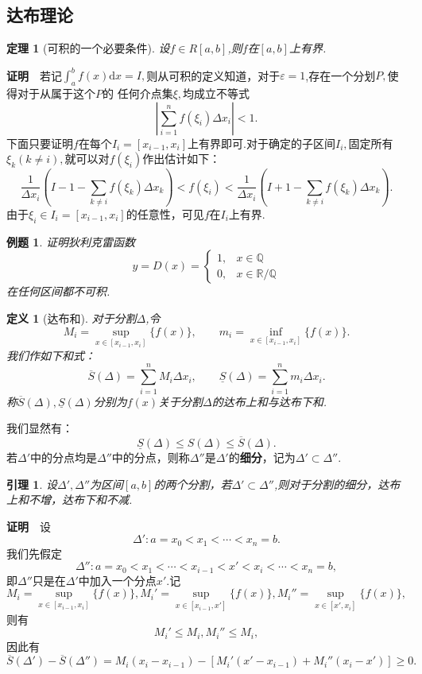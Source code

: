 \documentclass[UTF8]{article}
\newcommand{\dx}{\mathrm{d}x}
\newcommand{\zm}{\textbf{证明}$\quad$}
\newtheorem{thm}{\hspace{2em}定理}[section]
\newtheorem{lem}{\hspace{2em}引理}[section]
\newtheorem{dfn}{\hspace{2em}定义}[section]
\newtheorem{exa}{\hspace{2em}例题}[section]
\begin{document}
  \subsection{达布理论}
    \begin{thm}[可积的一个必要条件]
      设$f\in R[a,b]$,则$f$在$[a,b]$上有界.
    \end{thm}
    \zm 若记$\int_a^bf(x)\dx=I,$则从可积的定义知道，对于$\varepsilon=1$,存在一个分划$P,$使得对于从属于这个$P$的
    任何介点集$\xi,$均成立不等式
    $$\left|\sum_{i=1}^nf(\xi_i)\Delta x_i\right|<1.$$
    下面只要证明$f$在每个$I_i=[x_{i-1},x_i]$上有界即可.对于确定的子区间$I_i,$固定所有$\xi_k(k\ne i),$就可以对$f(\xi_i)$作出估计如下：
    $$\frac{1}{\Delta x_i}(I-1-\sum_{k\ne i}f(\xi_k)\Delta x_k)<f(\xi_i)<\frac{1}{\Delta x_i}(I+1-\sum_{k\ne i}f(\xi_k)\Delta x_k).$$
    由于$\xi_i\in I_i=[x_{i-1},x_i]$的任意性，可见$f$在$I_i$上有界.
    \begin{exa}
      证明狄利克雷函数
      $$y=D(x)=\begin{cases}1,&x\in\mathbb{Q}\\ 0,&x\in\mathbb{R}/\mathbb{Q}\end{cases}$$在任何区间都不可积.
    \end{exa}
    \begin{dfn}[达布和]
      对于分割$\Delta$,令
      $$M_i=\sup_{x\in[x_{i-1},x_i]}\{f(x)\},\qquad m_i=\inf_{x\in[x_{i-1},x_i]}\{f(x)\}.$$
      我们作如下和式：
      $$\overline{S}(\Delta)=\sum_{i=1}^nM_i\Delta x_i,\qquad \underline{S}(\Delta)=\sum_{i=1}^nm_i\Delta x_i.$$
      称$\overline{S}(\Delta),\underline{S}(\Delta)$分别为$f(x)$关于分割$\Delta$的达布上和与达布下和.
    \end{dfn}
    我们显然有：
    $$\underline{S}(\Delta)\le S(\Delta)\le \overline{S}(\Delta).$$
    若$\Delta'$中的分点均是$\Delta''$中的分点，则称$\Delta''$是$\Delta'$的\textbf{细分}，记为$\Delta'\subset\Delta''$.\\
    \begin{lem}\label{lem1}
      设$\Delta',\Delta''$为区间$[a,b]$的两个分割，若$\Delta'\subset\Delta''$,则对于分割的细分，达布上和不增，达布下和不减.
    \end{lem}
    \zm 设
    $$\Delta':a=x_0<x_1<\cdots<x_n=b.$$我们先假定
    $$\Delta'':a=x_0<x_1<\cdots<x_{i-1}<x'<x_i<\cdots<x_n=b,$$
    即$\Delta''$只是在$\Delta'$中加入一个分点$x'$.记
    $$M_i=\sup_{x\in[x_{i-1},x_i]}\{f(x)\},M_i'=\sup_{x\in[x_{i-1},x']}\{f(x)\},M_i''=\sup_{x\in[x',x_i]}\{f(x)\},$$
    则有$$M_i'\le M_i,M_i''\le M_i,$$因此有
    $$\overline{S}(\Delta')-\overline{S}(\Delta'')=M_i(x_i-x_{i-1})-[M_i'(x'-x_{i-1})+M_i''(x_i-x')]\ge0.$$
\end{document}
